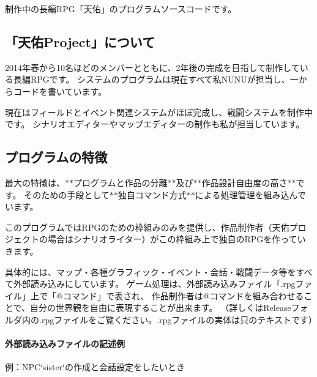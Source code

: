 制作中の長編\+R\+P\+G「天佑」のプログラムソースコードです。

\subsection*{「天佑\+Project」について}

2014年春から10名ほどのメンバーとともに、2年後の完成を目指して制作している長編\+R\+P\+Gです。 システムのプログラムは現在すべて私\+N\+U\+N\+Uが担当し、一からコードを書いています。

現在はフィールドとイベント関連システムがほぼ完成し、戦闘システムを制作中です。 シナリオエディターやマップエディターの制作も私が担当しています。

\subsection*{プログラムの特徴}

最大の特徴は、$\ast$$\ast$プログラムと作品の分離$\ast$$\ast$及び$\ast$$\ast$作品設計自由度の高さ$\ast$$\ast$です。 そのための手段として$\ast$$\ast$独自コマンド方式$\ast$$\ast$による処理管理を組み込んでいます。

このプログラムでは\+R\+P\+Gのための枠組みのみを提供し、作品制作者（天佑プロジェクトの場合はシナリオライター）がこの枠組み上で独自の\+R\+P\+Gを作っていきます。

具体的には、マップ・各種グラフィック・イベント・会話・戦闘データ等をすべて外部読み込みにしています。 ゲーム処理は、外部読み込みファイル「.\+rpgファイル」上で「@コマンド」で表され、 作品制作者は@コマンドを組み合わせることで、自分の世界観を自由に表現することが出来ます。 （詳しくは\+Releaseフォルダ内の.\+rpgファイルをご覧ください。.\+rpgファイルの実体は只のテキストです）

\paragraph*{外部読み込みファイルの記述例}

例：\+N\+PC\char`\"{}sister\char`\"{}の作成と会話設定をしたいとき

